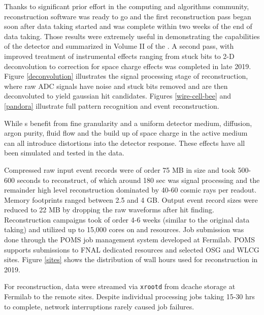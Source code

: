 Thanks to significant prior effort in the  computing and algorithms community, reconstruction software was ready to go and the first reconstruction pass began soon after data taking started and was complete within two weeks of the end of data taking.  Those results were extremely useful in demonstrating the capabilities of the detector and summarized in Volume II of the \cite{Abi:2020evt}.  A second pass, with improved treatment of instrumental effects ranging from stuck bits to 2-D deconvolution to correction for space charge effects was completed in late 2019. 
Figure \ref{deconvolution} illustrates the signal processing stage of reconstruction, where raw ADC signals have noise and stuck bits removed and are then deconvoluted to yield gaussian hit candidates. Figures \ref{wire-cell-bee} and \ref{pandora} illustrate full pattern recognition and event reconstruction. 

While s benefit from fine granularity and a uniform detector medium, diffusion, argon purity, fluid flow and the build up of space charge in the active medium can all introduce distortions into the detector response.  These effects have all been simulated and tested in the  data. 

Compressed raw input event records were of order 75 MB in size and took 500-600 seconds to reconstruct, of which around 180 sec was signal processing and the remainder high level reconstruction dominated by 40-60 cosmic rays per readout.  Memory footprints ranged between 2.5 and 4 GB.  Output event  record sizes were reduced to 22 MB by dropping the raw waveforms after hit finding.   Reconstruction campaigns took of order 4-6 weeks (similar to the original data taking) and utilized up to 15,000 cores on  and  resources.  Job submission was done through the POMS\cite{poms} job management system developed at Fermilab. POMS supports submissions to FNAL dedicated resources and selected OSG and WLCG sites.  Figure \ref{sites} shows the distribution of wall hours used for reconstruction in 2019. 

For reconstruction, data were streamed via {\tt xrootd}\cite{Behrmann:2011zz} from {dcache} storage at Fermilab to the remote sites. Despite individual processing jobs taking 15-30 hrs to complete, network interruptions rarely caused job failures. 


